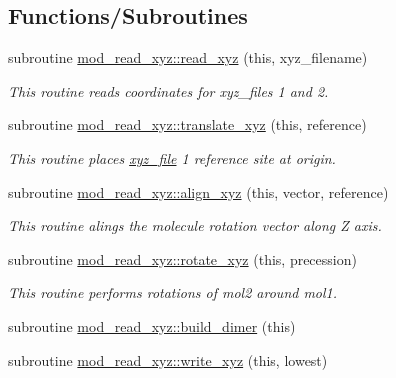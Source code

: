 \subsection*{Functions/\+Subroutines}
\begin{DoxyCompactItemize}
\item 
subroutine \hyperlink{namespacemod__read__xyz_aab6d00fb6cfd2cad4e18f8cb69deb456}{mod\+\_\+read\+\_\+xyz\+::read\+\_\+xyz} (this, xyz\+\_\+filename)
\begin{DoxyCompactList}\small\item\em This routine reads coordinates for xyz\+\_\+files 1 and 2. \end{DoxyCompactList}\item 
subroutine \hyperlink{namespacemod__read__xyz_a28a0648307ac1a30adc5bf4571709a58}{mod\+\_\+read\+\_\+xyz\+::translate\+\_\+xyz} (this, reference)
\begin{DoxyCompactList}\small\item\em This routine places \hyperlink{structmod__read__xyz_1_1xyz__file}{xyz\+\_\+file} 1 reference site at origin. \end{DoxyCompactList}\item 
subroutine \hyperlink{namespacemod__read__xyz_a6f62f86e40973634abc710a8c5b9db23}{mod\+\_\+read\+\_\+xyz\+::align\+\_\+xyz} (this, vector, reference)
\begin{DoxyCompactList}\small\item\em This routine alings the molecule rotation vector along Z axis. \end{DoxyCompactList}\item 
subroutine \hyperlink{namespacemod__read__xyz_ab1b3f67fa055b9311858ca333970405e}{mod\+\_\+read\+\_\+xyz\+::rotate\+\_\+xyz} (this, precession)
\begin{DoxyCompactList}\small\item\em This routine performs rotations of mol2 around mol1. \end{DoxyCompactList}\item 
subroutine \hyperlink{namespacemod__read__xyz_ab27344d0596837a5864730e51a5826af}{mod\+\_\+read\+\_\+xyz\+::build\+\_\+dimer} (this)
\item 
subroutine \hyperlink{namespacemod__read__xyz_a86235488f0f7fd76cccfa75734903206}{mod\+\_\+read\+\_\+xyz\+::write\+\_\+xyz} (this, lowest)
\end{DoxyCompactItemize}
